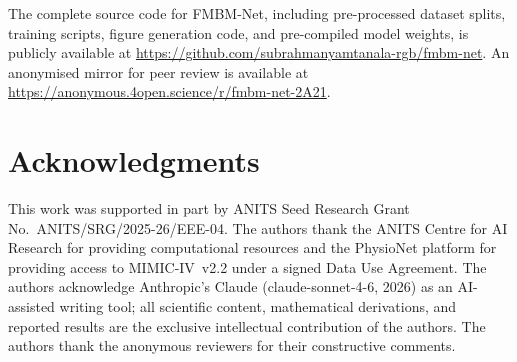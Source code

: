 \documentclass{ieeeaccess}
\begin{document}
The complete source code for FMBM-Net, including pre-processed dataset
splits, training scripts, figure generation code, and pre-compiled model
weights, is publicly available at
\url{https://github.com/subrahmanyamtanala-rgb/fmbm-net}.
An anonymised mirror for peer review is available at
\url{https://anonymous.4open.science/r/fmbm-net-2A21}.

\section*{Acknowledgments}

This work was supported in part by ANITS Seed Research Grant
No.~ANITS/SRG/2025-26/EEE-04. The authors thank the ANITS Centre for AI
Research for providing computational resources and the PhysioNet platform
for providing access to MIMIC-IV~v2.2 under a signed Data Use Agreement.
The authors acknowledge Anthropic's Claude (claude-sonnet-4-6, 2026) as
an AI-assisted writing tool; all scientific content, mathematical
derivations, and reported results are the exclusive intellectual contribution
of the authors. The authors thank the anonymous reviewers for their
constructive comments.
\end{document}

